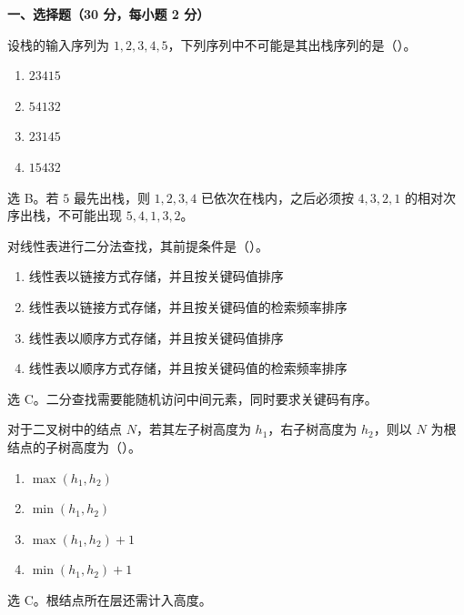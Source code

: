 
\textbf{一、选择题（30 分，每小题 2 分）}

\begin{question}
设栈的输入序列为 $1,2,3,4,5$，下列序列中不可能是其出栈序列的是（\quad）。
\begin{enumerate}
  \item $23415$
  \item $54132$
  \item $23145$
  \item $15432$
\end{enumerate}
\begin{solution}
选 B。若 $5$ 最先出栈，则 $1,2,3,4$ 已依次在栈内，之后必须按 $4,3,2,1$ 的相对次序出栈，不可能出现 $5,4,1,3,2$。
\end{solution}
\end{question}

\begin{question}
对线性表进行二分法查找，其前提条件是（\quad）。
\begin{enumerate}
  \item 线性表以链接方式存储，并且按关键码值排序
  \item 线性表以链接方式存储，并且按关键码值的检索频率排序
  \item 线性表以顺序方式存储，并且按关键码值排序
  \item 线性表以顺序方式存储，并且按关键码值的检索频率排序
\end{enumerate}
\begin{solution}
选 C。二分查找需要能随机访问中间元素，同时要求关键码有序。
\end{solution}
\end{question}

\begin{question}
对于二叉树中的结点 $N$，若其左子树高度为 $h_1$，右子树高度为 $h_2$，则以 $N$ 为根结点的子树高度为（\quad）。
\begin{enumerate}
  \item $\max(h_1,h_2)$
  \item $\min(h_1,h_2)$
  \item $\max(h_1,h_2)+1$
  \item $\min(h_1,h_2)+1$
\end{enumerate}
\begin{solution}
选 C。根结点所在层还需计入高度。
\end{solution}
\end{question}

